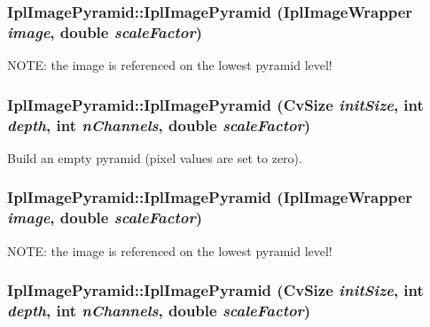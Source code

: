 \hypertarget{class_ipl_image_pyramid_a6d41d348cdfaea6e4444b1fdd523f555}{
\subsubsection[{IplImagePyramid}]{\setlength{\rightskip}{0pt plus 5cm}IplImagePyramid::IplImagePyramid ({\bf IplImageWrapper} {\em image}, \/  double {\em scaleFactor})}}
\label{class_ipl_image_pyramid_a6d41d348cdfaea6e4444b1fdd523f555}
NOTE: the image is referenced on the lowest pyramid level! \hypertarget{class_ipl_image_pyramid_a817d4a60ac96b844a97df0fa1bc52a5e}{
\subsubsection[{IplImagePyramid}]{\setlength{\rightskip}{0pt plus 5cm}IplImagePyramid::IplImagePyramid (CvSize {\em initSize}, \/  int {\em depth}, \/  int {\em nChannels}, \/  double {\em scaleFactor})}}
\label{class_ipl_image_pyramid_a817d4a60ac96b844a97df0fa1bc52a5e}
Build an empty pyramid (pixel values are set to zero). \hypertarget{class_ipl_image_pyramid_a6d41d348cdfaea6e4444b1fdd523f555}{
\subsubsection[{IplImagePyramid}]{\setlength{\rightskip}{0pt plus 5cm}IplImagePyramid::IplImagePyramid ({\bf IplImageWrapper} {\em image}, \/  double {\em scaleFactor})}}
\label{class_ipl_image_pyramid_a6d41d348cdfaea6e4444b1fdd523f555}
NOTE: the image is referenced on the lowest pyramid level! \hypertarget{class_ipl_image_pyramid_a817d4a60ac96b844a97df0fa1bc52a5e}{
\subsubsection[{IplImagePyramid}]{\setlength{\rightskip}{0pt plus 5cm}IplImagePyramid::IplImagePyramid (CvSize {\em initSize}, \/  int {\em depth}, \/  int {\em nChannels}, \/  double {\em scaleFactor})}}

